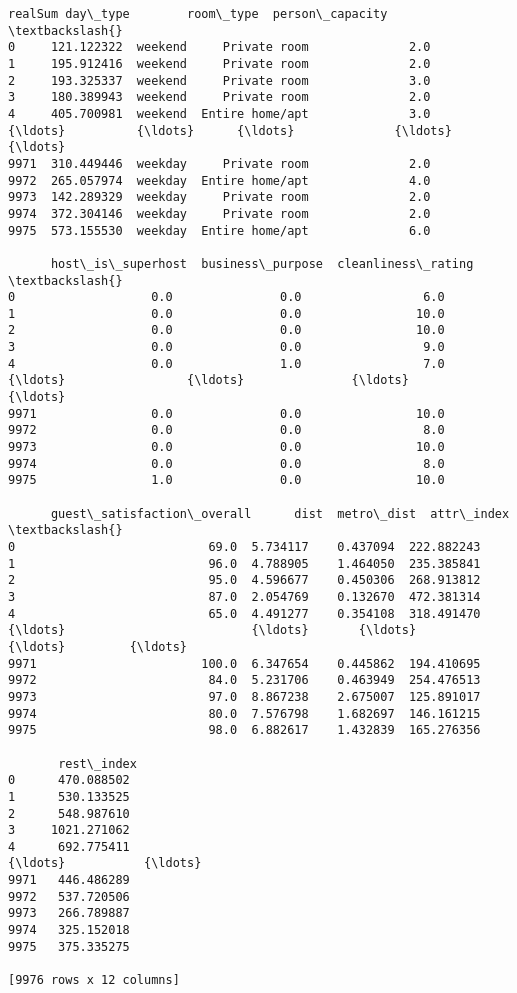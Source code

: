 \documentclass[11pt]{article}
\makeatletter
\newcommand{\boxspacing}{\kern\kvtcb@left@rule\kern\kvtcb@boxsep}
\newcommand{\prompt}[4]{
        {\ttfamily\llap{{\color{#2}[#3]:\hspace{3pt}#4}}\vspace{-\baselineskip}}
    }
\makeatother
\begin{document}
            \begin{tcolorbox}[breakable, size=fbox, boxrule=.5pt, pad at break*=1mm, opacityfill=0]
\prompt{Out}{outcolor}{500}{\boxspacing}
\begin{Verbatim}[commandchars=\\\{\}]
         realSum day\_type        room\_type  person\_capacity  \textbackslash{}
0     121.122322  weekend     Private room              2.0
1     195.912416  weekend     Private room              2.0
2     193.325337  weekend     Private room              3.0
3     180.389943  weekend     Private room              2.0
4     405.700981  weekend  Entire home/apt              3.0
{\ldots}          {\ldots}      {\ldots}              {\ldots}              {\ldots}
9971  310.449446  weekday     Private room              2.0
9972  265.057974  weekday  Entire home/apt              4.0
9973  142.289329  weekday     Private room              2.0
9974  372.304146  weekday     Private room              2.0
9975  573.155530  weekday  Entire home/apt              6.0

      host\_is\_superhost  business\_purpose  cleanliness\_rating  \textbackslash{}
0                   0.0               0.0                 6.0
1                   0.0               0.0                10.0
2                   0.0               0.0                10.0
3                   0.0               0.0                 9.0
4                   0.0               1.0                 7.0
{\ldots}                 {\ldots}               {\ldots}                 {\ldots}
9971                0.0               0.0                10.0
9972                0.0               0.0                 8.0
9973                0.0               0.0                10.0
9974                0.0               0.0                 8.0
9975                1.0               0.0                10.0

      guest\_satisfaction\_overall      dist  metro\_dist  attr\_index  \textbackslash{}
0                           69.0  5.734117    0.437094  222.882243
1                           96.0  4.788905    1.464050  235.385841
2                           95.0  4.596677    0.450306  268.913812
3                           87.0  2.054769    0.132670  472.381314
4                           65.0  4.491277    0.354108  318.491470
{\ldots}                          {\ldots}       {\ldots}         {\ldots}         {\ldots}
9971                       100.0  6.347654    0.445862  194.410695
9972                        84.0  5.231706    0.463949  254.476513
9973                        97.0  8.867238    2.675007  125.891017
9974                        80.0  7.576798    1.682697  146.161215
9975                        98.0  6.882617    1.432839  165.276356

       rest\_index
0      470.088502
1      530.133525
2      548.987610
3     1021.271062
4      692.775411
{\ldots}           {\ldots}
9971   446.486289
9972   537.720506
9973   266.789887
9974   325.152018
9975   375.335275

[9976 rows x 12 columns]
\end{Verbatim}
\end{tcolorbox}
        
\end{document}
